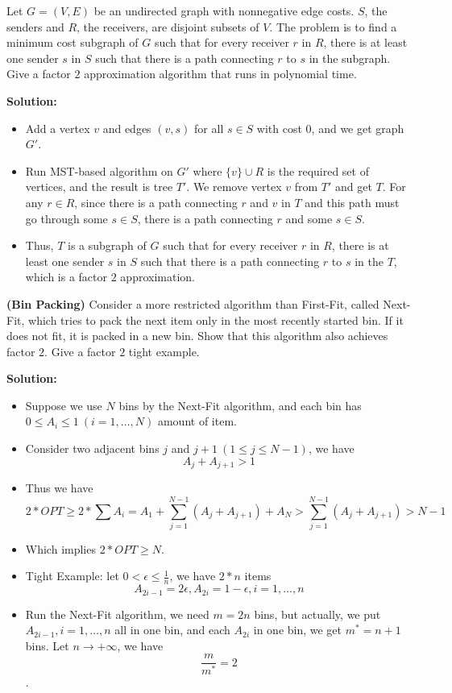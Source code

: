 \documentclass{article}
\newcounter{exercise}
\newcommand{\<}{
    \langle}
\renewcommand{\>}{
    \rangle}
\begin{document}
{\newpage

\begin{exercise}
	Let $G = (V, E)$ be an undirected graph with nonnegative edge costs. $S$, the senders and $R$, the receivers, are disjoint subsets of $V$. The problem is to find a minimum cost subgraph of $G$ such that for every receiver $r$ in $R$, there is at least one sender $s$ in $S$ such that there is a path connecting $r$ to $s$ in the subgraph. Give a factor $2$ approximation algorithm that runs in polynomial time.
\end{exercise}

\textbf{Solution:}
\begin{itemize}
	\item Add a vertex $v$ and edges $(v,s)$ for all $s\in S$ with cost $0$, and we get graph $G'$.
	\item Run MST-based algorithm on $G'$ where $\{v\}\cup R$ is the required set of vertices, and the result is tree $T'$. We remove vertex $v$ from $T'$ and get $T$. For any $r\in R$, since there is a path connecting $r$ and $v$ in $T$ and this path must go through some $s\in S$, there is a path connecting $r$ and some $s\in S$.
	\item Thus, $T$ is a subgraph of $G$ such that for every receiver $r$ in $R$, there is at least one sender $s$ in $S$ such that there is a path connecting $r$ to $s$ in the $T$, which is a factor $2$ approximation.
\end{itemize}
\newpage




\begin{exercise}
	\textbf{(Bin Packing)} Consider a more restricted algorithm than First-Fit, called Next-Fit, which tries to pack the next item only in the most recently started bin. If it does not fit, it is packed in a new bin. Show that this algorithm also achieves factor $2$. Give a factor $2$ tight example.
\end{exercise}

\textbf{Solution:}
\begin{itemize}
	\item Suppose we use $N$ bins by the Next-Fit algorithm, and each bin has $0\leq A_i\leq 1\ (i=1,\ldots ,N)$ amount of item.
	\item Consider two adjacent bins $j$ and $j+1\ (1\leq j\leq N-1)$, we have
	$$
	A_j + A_{j+1}>1
	$$
	\item Thus we have
	$$
	2*OPT\geq 2*\sum{A_i}=A_1+\sum\limits_{j=1}^{N-1}{(A_j + A_{j+1})}+A_N>\sum\limits_{j=1}^{N-1}{(A_j + A_{j+1})}>N-1
	$$
	\item Which implies $2*OPT\geq N$.
	\item Tight Example: let $0<\epsilon\leq \frac{1}{n}$, we have $2*n$ items
	$$
	A_{2i-1}=2\epsilon,A_{2i}=1-\epsilon,i=1,\ldots,n
	$$
	\item Run the Next-Fit algorithm, we need $m=2n$ bins, but actually, we put $A_{2i-1},i=1,\ldots,n$ all in one bin, and each $A_{2i}$ in one bin, we get $m^*=n+1$ bins. Let $n\rightarrow +\infty$, we have 
	$$
	\frac{m}{m^*}=2
	$$.
\end{itemize}
\newpage



}
\end{document}
